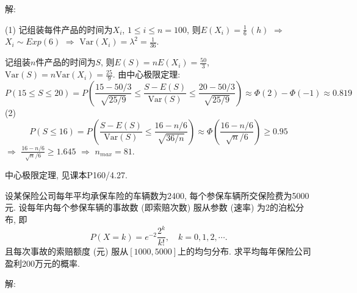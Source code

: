 \documentclass[standard]{ExBook}
\begin{document}
\begin{qitems}
\vspace{-5em}

    \begin{bbox}
解: 

(1) 记组装每件产品的时间为$X_i$, $1\leq i\leq n=100$, 则$E(X_i)=\displaystyle \frac{1}{6}\ (h)$ $\Longrightarrow$ $X_i\sim Exp(6)$ $\Longrightarrow$ $\mathrm{Var}(X_i)=\lambda^2=\displaystyle\frac{1}{36}$.
    \end{bbox}

\vspace{-5em}

    \begin{bbox}
记组装$n$件产品的时间为$S$, 则$\displaystyle E(S)=nE(X_i)=\frac{50}{3}$, $\displaystyle \mathrm{Var}(S)=n\mathrm{Var}(X_i)=\frac{25}{9}$. 由中心极限定理:
$$\displaystyle P(15\leq S\leq 20)=P\left(\frac{15-50/3}{\sqrt{25/9}} \leq \frac{S-E(S)}{\mathrm{Var}(S)} \leq \frac{20-50/3}{\sqrt{25/9}}\right) \approx \Phi(2)-\Phi(-1) \approx 0.819$$
(2)
$$\displaystyle P(S\leq 16)=P\left(\frac{S-E(S)}{\mathrm{Var}(S)} \leq \frac{16-n/6}{\sqrt{36/n}}\right) \approx \Phi\left(\frac{16-n/6}{\sqrt{n}/6}\right) \geq 0.95$$
$\Longrightarrow$ $\displaystyle \frac{16-n/6}{\sqrt{n}/6} \geq 1.645$ $\Longrightarrow$ $n_{max}=81$.

\textcolor{themeColor}{\selectfont {} 中心极限定理, 见课本P160/4.27.}
    \end{bbox}

\vspace{-5em}

    \begin{bbox}
    \begin{shaded}
        \qitem
设某保险公司每年平均承保车险的车辆数为2400, 每个参保车辆所交保险费为5000元. 设每年内每个参保车辆的事故数 (即索赔次数) 服从参数 (速率) 为2的泊松分布, 即
$$P(X=k)=\displaystyle e^{-2}\frac{2^k}{k!},\quad k=0,1,2,\cdots.$$
且每次事故的索赔额度 (元) 服从$[1000,5000]$上的均匀分布. 求平均每年保险公司盈利200万元的概率.
    \end{shaded}
    \end{bbox}

\vspace{-5em}

    \begin{bbox}
解: 


\end{bbox}
\end{qitems}
\end{document}
